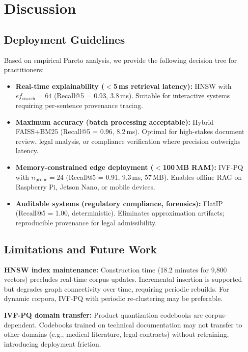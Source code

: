 \documentclass[conference]{IEEEtran}
\begin{document}
\section{Discussion}

\subsection{Deployment Guidelines}

Based on empirical Pareto analysis, we provide the following decision tree for practitioners:

\begin{itemize}
    \item \textbf{Real-time explainability ($<$5\,ms retrieval latency):} HNSW with $ef_{\mathrm{search}}{=}64$ (Recall@5 = 0.93, 3.8\,ms). Suitable for interactive systems requiring per-sentence provenance tracing.
    
    \item \textbf{Maximum accuracy (batch processing acceptable):} Hybrid FAISS+BM25 (Recall@5 = 0.96, 8.2\,ms). Optimal for high-stakes document review, legal analysis, or compliance verification where precision outweighs latency.
    
    \item \textbf{Memory-constrained edge deployment ($<$100\,MB RAM):} IVF-PQ with $n_{\mathrm{probe}}{=}24$ (Recall@5 = 0.91, 9.3\,ms, 57\,MB). Enables offline RAG on Raspberry Pi, Jetson Nano, or mobile devices.
    
    \item \textbf{Auditable systems (regulatory compliance, forensics):} FlatIP (Recall@5 = 1.00, deterministic). Eliminates approximation artifacts; reproducible provenance for legal admissibility.
\end{itemize}

\subsection{Limitations and Future Work}

\textbf{HNSW index maintenance:} Construction time (18.2 minutes for 9,800 vectors) precludes real-time corpus updates. Incremental insertion is supported but degrades graph connectivity over time, requiring periodic rebuilds. For dynamic corpora, IVF-PQ with periodic re-clustering may be preferable.

\textbf{IVF-PQ domain transfer:} Product quantization codebooks are corpus-dependent. Codebooks trained on technical documentation may not transfer to other domains (e.g., medical literature, legal contracts) without retraining, introducing deployment friction.
\end{document}

